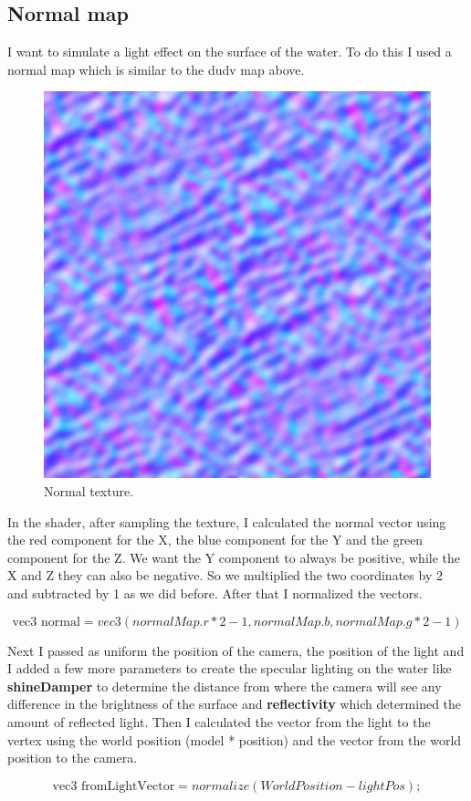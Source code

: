 \subsection{Normal map}
I want to simulate a light effect on the surface of the water. To do this I used a normal map which is similar to the dudv map above. 

\newpage

\begin{figure}[hbt!]
	\centering
	\includegraphics[width= 0.5
	\textwidth]{../textures/plane/normalMap.png}
	\caption{Normal texture.}
\end{figure} 

\noindent
In the shader, after sampling the texture, I calculated the normal vector using the red component for the X, the blue component for the Y and the green component for the Z. We want the Y component to always be positive, while the X and Z they can also be negative. So we multiplied the two coordinates by 2 and subtracted by 1 as we did before. After that I normalized the vectors.

\begin{equation}
\text{vec3 normal} = vec3(normalMap.r * 2 - 1, normalMap.b, normalMap.g * 2 - 1)		
\end{equation}

\noindent
Next I passed as uniform the position of the camera, the position of the light and I added a few more parameters to create the specular lighting on the water like \textbf{shineDamper} to determine the distance from where the camera will see any difference in the brightness of the surface and \textbf{reflectivity} which determined the amount of reflected light.
Then I calculated the vector from the light to the vertex using the world position (model * position) and the vector from the world position to the camera.

\begin{equation}
\text{vec3 fromLightVector} = normalize(WorldPosition - lightPos);
\end{equation}

